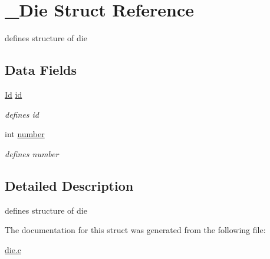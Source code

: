 \hypertarget{struct__Die}{}\section{\+\_\+\+Die Struct Reference}
\label{struct__Die}


defines structure of die  


\subsection*{Data Fields}
\begin{DoxyCompactItemize}
\item 
\mbox{\label{struct__Die_a0887af562dda760409957f13619d36f1}} 
\hyperlink{types_8h_a845e604fb28f7e3d97549da3448149d3}{Id} \hyperlink{struct__Die_a0887af562dda760409957f13619d36f1}{id}
\begin{DoxyCompactList}\small\item\em defines id \end{DoxyCompactList}\item 
\mbox{\label{struct__Die_a16b4c5c0c2bf0d152e1588c555a1dec0}} 
int \hyperlink{struct__Die_a16b4c5c0c2bf0d152e1588c555a1dec0}{number}
\begin{DoxyCompactList}\small\item\em defines number \end{DoxyCompactList}\end{DoxyCompactItemize}


\subsection{Detailed Description}
defines structure of die 

The documentation for this struct was generated from the following file\+:\begin{DoxyCompactItemize}
\item 
\hyperlink{die_8c}{die.\+c}\end{DoxyCompactItemize}

